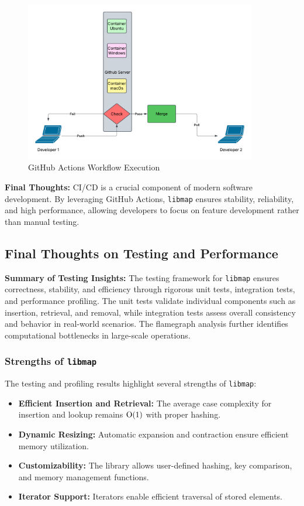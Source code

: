 \documentclass[titlepage]{article}
\begin{document}
\begin{figure}[H]
    \centering
    \includegraphics[width=0.9\textwidth]{github_actions.pdf}
    \caption{GitHub Actions Workflow Execution}
    \label{fig:github_actions}
\end{figure}



\textbf{Final Thoughts:}  
CI/CD is a crucial component of modern software development. By leveraging GitHub Actions, \texttt{libmap} ensures stability, reliability, and high performance, allowing developers to focus on feature development rather than manual testing.





\subsection{Final Thoughts on Testing and Performance}

\textbf{Summary of Testing Insights:}
The testing framework for \texttt{libmap} ensures correctness, stability, and efficiency through rigorous unit tests, integration tests, and performance profiling. The unit tests validate individual components such as insertion, retrieval, and removal, while integration tests assess overall consistency and behavior in real-world scenarios. The flamegraph analysis further identifies computational bottlenecks in large-scale operations.

\subsubsection{Strengths of \texttt{libmap}}
The testing and profiling results highlight several strengths of \texttt{libmap}:
\begin{itemize}
    \item \textbf{Efficient Insertion and Retrieval:} The average case complexity for insertion and lookup remains \( $O(1)$ \) with proper hashing.
    \item \textbf{Dynamic Resizing:} Automatic expansion and contraction ensure efficient memory utilization.
    \item \textbf{Customizability:} The library allows user-defined hashing, key comparison, and memory management functions.
    \item \textbf{Iterator Support:} Iterators enable efficient traversal of stored elements.
\end{itemize}
\end{document}
